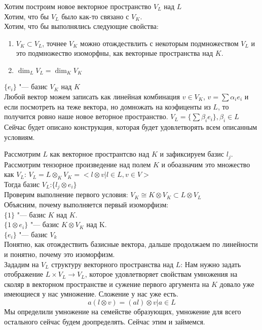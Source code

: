 \begin{enumerate}
Хотим построим новое векторное пространство $V_L$ над $L$\\
Хотим, что бы $V_L$ было как-то связано с $V_K$.\\
Хотим, что бы выполнялись следующие свойства:
\begin{enumerate}
\item $V_K \subset V_L$, точнее $V_K$ можно отождествлить 
с некоторым подмножеством $V_L$ и это подмножество изоморфны, как 
векторные пространства над $K$.
\item $\dim_L V_L = \dim_K V_K$
\end{enumerate}

$\{e_i\}$ "--- базис $V_K$ над $K$\\
Любой вектор можем записать как линейная комбинация $v \in V_K$, 
$v = \sum \alpha_i e_i$ и если посмотреть на теже вектора, но домножать на 
коэфиценты из $L$, то получится ровно наше новое веторное пространство. 
$V_L  = \{\sum \beta_ie_i\}, \beta_i \in L$\\

Сейчас будет описано конструкция, которая будет удовлетворять всем 
описанным условиям.

Рассмотрим $L$ как векторное пространтсво над $K$ и зафиксируем базис $l_j$.\\

Рассмотрим тензорное произведение над полем $K$ и обоазначим это множество как $V_L$:
$V_L = L \otimes_{K} V_K = < l \otimes v | l \in L, v \in V >$\\

Тогда базис $V_L$:$\{l_j \otimes e_i\}$\\

Проверим выполнение первого условия: $V_K \cong K \otimes V_K \subset L \otimes V_L$\\
Объясним, почему выполняется первый изоморфизм:\\
$\{1\}$ "--- базис $K$ над $K$.\\
$\{1 \otimes e_i\}$ "--- базис $K \otimes V_K$ над K.\\
$\{e_i\}$ "--- базис $V_k$\\
Понятно, как отождествить базисные вектора, дальше продолжаем по линейности и понятно, почему это 
изоморфизм.\\

Зададим на $V_L$ структуру векторного пространства над $L$:
Нам нужно задать отображение $L \times V_L \to V_L$, которое удовлетворяет свойствам умножения на сколяр в 
векторном пространстве и сужение первого аргумента на $K$ довало уже имеющиеся у нас умножение. Сложение у нас уже есть.
$$a(l \otimes v) = (al) \otimes v | a \in L $$
Мы определили умножение на семействе образующих, умножение для всего остального сейчас будем доопределять.
Сейчас этим и займемся.


\end{enumerate}

